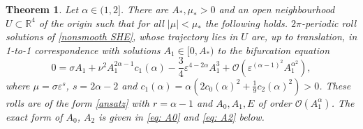\documentclass{article}
\numberwithin{equation}{section}
\newtheorem{theorem}{Theorem}[section]
\def\R{\mathbb{R}}
\def\eps{\varepsilon}
\def\calO{\mathcal{O}}
\begin{document}
\begin{theorem}\label{thm:rolls1}
Let $\alpha\in(1,2]$. There are $A_*,\mu_*>0$ and an open neighbourhood $U\subset \R^4$ of the origin such that for all $|\mu|<\mu_*$ the following holds. $2\pi$-periodic roll solutions of \eqref{nonsmooth SHE}, whose trajectory lies in $U$ are, up to translation, in 1-to-1 correspondence with solutions $A_1\in[0,A_*)$ to the bifurcation equation 
\begin{equation}\label{eq:genbifeq}
0 = \sigma A_1 + \nu^2 A_1^{2\alpha -1}c_1(\alpha) - \frac{3}{4} \varepsilon^{4-2\alpha} A_1^3 + \calO(\eps^{(\alpha-1)^2}A_1^{\alpha^2}),
\end{equation}
where $\mu = \sigma \eps^s$, $s=2\alpha-2$ and $c_1(\alpha)=\alpha \left(2 c_0(\alpha)^2 + \frac1 9 c_2(\alpha)^2 \right)>0$. These rolls are of the form \eqref{ansatz} with $r=\alpha-1$ and $A_0, A_1, E$ of order $\calO(A_1^\alpha)$. The exact form of $A_0$, $A_2$ is given in \eqref{eq: A0} and \eqref{eq: A2} below.
\end{theorem}
\end{document}
